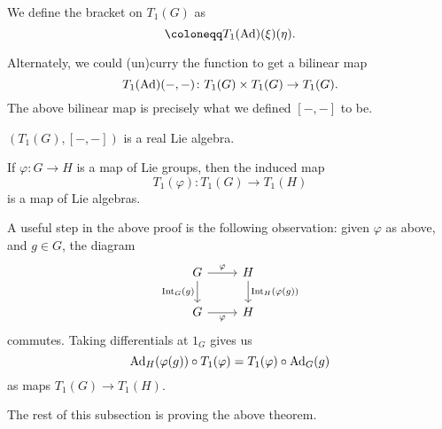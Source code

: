 \documentclass[12pt]{article}
\begin{document}
We define the bracket on $T_{1}(G)$ as
\begin{equation*} 
	[\xi, \eta] \coloneqq T_{1}(\Ad)(\xi)(\eta).
\end{equation*}

Alternately, we could (un)curry the function  to get a bilinear map
\begin{equation*} 
	T_{1}(\operatorname{Ad})(-, -) \colon T_{1}(G) \times T_{1}(G) \to T_{1}(G).
\end{equation*}
The above bilinear map is precisely what we defined $[-, -]$ to be.

\begin{thm} \label{thm:lie-algebra-functor}
	$(T_{1}(G), [-, -])$ is a real Lie algebra.

	If $\varphi : G \to H$ is a map of Lie groups, then the induced map
	\begin{equation*} 
		T_{1}(\varphi) \colon T_{1}(G) \to T_{1}(H)
	\end{equation*}
	is a map of Lie algebras.
\end{thm}

A useful step in the above proof is the following observation: 
given $\varphi$ as above, and $g \in G$, the diagram
\begin{equation*} 
	\begin{tikzcd}
		G \arrow[r, "\varphi"] \arrow[d, "\INT_{G}(g)"'] & H \arrow[d, "\INT_{H}(\varphi(g))"] \\
		G \arrow[r, "\varphi"'] & H
	\end{tikzcd}
\end{equation*}
commutes. Taking differentials at $1_{G}$ gives us
\begin{equation*} 
	\operatorname{Ad}_{H}(\varphi(g)) \circ T_{1}(\varphi) = T_{1}(\varphi) \circ \operatorname{Ad}_{G}(g)
\end{equation*}
as maps $T_{1}(G) \to T_{1}(H)$.

The rest of this subsection is proving the above theorem.
\end{document}
